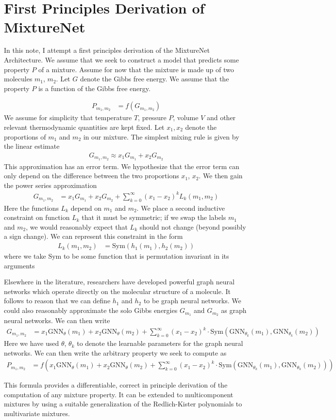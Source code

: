 \documentclass[book.tex]{subfiles}
\begin{document}
\chapter{First Principles Derivation of MixtureNet}

In this note, I attempt a first principles derivation of the MixtureNet Architecture. We assume that we seek to construct a model that predicts some property $P$ of a mixture. Assume for now that the mixture is made up of two molecules $m_1$, $m_2$. Let $G$ denote the Gibbs free energy. We assume that the property $P$ is a function of the Gibbs free energy.

\begin{align}
P_{m_1,m_2} &= f(G_{m_1, m_2})
\end{align}
We assume for simplicity that temperature $T$, pressure $P$, volume $V$ and other relevant thermodynamic quantities are kept fixed. Let $x_1, x_2$ denote the proportions of $m_1$ and $m_2$ in our mixture. The simplest mixing rule is given by the linear estimate
\begin{align}
G_{m_1,m_2} \approx x_1 G_{m_1} + x_2 G_{m_2}
\end{align}
This approximation has an error term. We hypothesize that the error term can only depend on the difference between the two proportions $x_1$, $x_2$. We then gain the power series approximation
\begin{align}
G_{m_1, m_2} &= x_1 G_{m_1} + x_2 G_{m_2} + \sum_{k=0}^\infty (x_1 - x_2)^k L_k(m_1, m_2)
\end{align}
Here the functions $L_k$ depend on $m_1$ and $m_2$. We place a second inductive constraint on function $L_k$ that it must be symmetric; if we swap the labels $m_1$ and $m_2$, we would reasonably expect that $L_k$ should not change (beyond possibly a sign change). We can represent this constraint in the form
\begin{align}
L_k(m_1, m_2) &= \textrm{Sym}(h_1(m_1), h_2(m_2))
\end{align}
where we take $\textrm{Sym}$ to be some function that is permutation invariant in its arguments

Elsewhere in the literature, researchers have developed powerful graph neural networks which operate directly on the molecular structure of a molecule. It follows to reason that we can define $h_1$ and $h_2$ to be graph neural networks. We could also reasonably approximate the solo Gibbs energies $G_{m_1}$ and $G_{m_2}$ as graph neural networks. We can then write
\begin{align}
G_{m_1,m_2} &= x_1 \textrm{GNN}_\theta(m_1) + x_2 \textrm{GNN}_\theta(m_2) + \sum_{k=0}^\infty (x_1 - x_2)^k  \cdot \textrm{Sym}(\textrm{GNN}_{\theta_k}(m_1), \textrm{GNN}_{\theta_k}(m_2))
\end{align}
Here we have used $\theta$, $\theta_k$ to denote the learnable parameters for the graph neural networks. We can then write the arbitrary property we seek to compute as
\begin{align}
P_{m_1,m_2} &= f\left (x_1 \textrm{GNN}_\theta(m_1) + x_2 \textrm{GNN}_\theta(m_2) + \sum_{k=0}^\infty (x_1 - x_2)^k  \cdot \textrm{Sym}(\textrm{GNN}_{\theta_k}(m_1), \textrm{GNN}_{\theta_k}(m_2))\right )
\end{align}

This formula provides a differentiable, correct in principle derivation of the computation of any mixture property. It can be extended to multicomponent mixtures by using a suitable generalization of the Redlich-Kister polynomials to multivariate mixtures.
\end{document}

